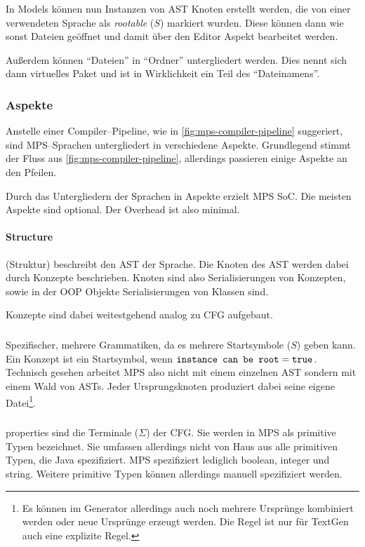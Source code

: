 In Models können nun Instanzen von \ac{AST} Knoten erstellt werden, die von einer verwendeten Sprache als \textit {rootable} ($S$) markiert wurden.
Diese können dann wie sonst Dateien geöffnet und damit über den Editor Aspekt bearbeitet werden.

Außerdem können \enquote{Dateien} in \enquote{Ordner} untergliedert werden.
Dies nennt sich dann virtuelles Paket und ist in Wirklichkeit ein Teil des \enquote{Dateinamens}.

\subsubsection{Aspekte}\label{subsubsec:aspekte}
Anstelle einer Compiler--Pipeline, wie in \autoref{fig:mps-compiler-pipeline} suggeriert, sind \acs{MPS}--Sprachen untergliedert in verschiedene Aspekte.
Grundlegend stimmt der Fluss aus \autoref{fig:mps-compiler-pipeline}, allerdings passieren einige Aspekte an den Pfeilen.

Durch das Untergliedern der Sprachen in Aspekte erzielt \ac{MPS} \ac{SoC}.
Die meisten Aspekte sind optional.
Der Overhead ist also minimal.

\paragraph{Structure} (Struktur) beschreibt den \ac{AST} der Sprache.
Die Knoten des \ac{AST} werden dabei durch Konzepte beschrieben.
Knoten sind also Serialisierungen von Konzepten, sowie in der \ac{OOP} Objekte Serialisierungen von Klassen sind.


Konzepte sind dabei weitestgehend analog zu \ac{CFG} aufgebaut.

\subparagraph*{}
Spezifischer, mehrere Grammatiken, da es mehrere Startsymbole ($S$) geben kann.
Ein Konzept ist ein Startsymbol, wenn $\text{\ttfamily instance can be root}=\text{\ttfamily true}$.
Technisch gesehen arbeitet \ac{MPS} also nicht mit einem einzelnen \ac{AST} sondern mit einem Wald von \acp{AST}.
Jeder Ursprungsknoten produziert dabei seine eigene Datei\footnote{Es können im Generator allerdings auch noch mehrere Ursprünge kombiniert werden oder neue Ursprünge erzeugt werden. Die Regel ist nur für TextGen auch eine explizite Regel.}.

\subparagraph*{}
{\ttfamily properties} sind die Terminale ($\Sigma$) der \ac{CFG}.
Sie werden in \ac{MPS} als primitive Typen bezeichnet.
Sie umfassen allerdings nicht von Haus aus alle primitiven Typen, die Java spezifiziert.
\ac{MPS} spezifiziert lediglich {\ttfamily boolean}, {\ttfamily integer} und {\ttfamily string}.
Weitere primitive Typen können allerdings manuell spezifiziert werden.

